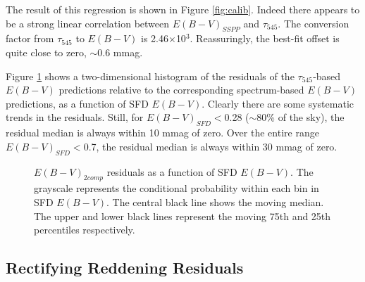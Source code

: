 \documentclass{emulateapj}
\begin{document}

The result of this regression is shown in Figure \ref{fig:calib}. Indeed there 
appears to be a strong linear correlation between $E(B-V)_{SSPP}$ 
and $\tau_{545}$. The conversion factor from $\tau_{545}$ to $E(B-V)$ is 
2.46$\times$10$^{3}$. Reassuringly, the best-fit offset is quite close to 
zero, $\sim$0.6 mmag.

Figure \ref{fig:resid} shows a two-dimensional histogram of the residuals of
the $\tau_{545}$-based $E(B-V)$ predictions relative to the corresponding
spectrum-based $E(B-V)$ predictions, as a function of SFD $E(B-V)$. Clearly 
there are some systematic trends in the residuals. Still, for 
$E(B-V)_{SFD}$$<$0.28 ($\sim$80\% of the sky), the residual median is always 
within 10 mmag of zero. Over the entire range $E(B-V)_{SFD}$$<$0.7, the 
residual median is always within 30 mmag of zero.

\begin{figure}
\begin{center}
\caption{\label{fig:resid} $E(B-V)_{2comp}$ residuals as a function of
SFD $E(B-V)$. The grayscale represents the conditional probability within each
bin in SFD $E(B-V)$. The central black line shows the moving median. The upper
and lower black lines represent the moving 75th and 25th percentiles 
respectively.}
\end{center}
\end{figure}

\subsection{Rectifying Reddening Residuals}


\end{document}
